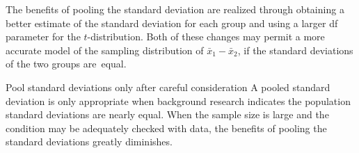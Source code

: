 {The benefits of pooling the standard deviation are realized through obtaining a better estimate of the standard deviation for each group and using a larger df parameter for the $t$-distribution. Both of these changes may permit a more accurate model of the sampling distribution of $\bar{x}_1 - \bar{x}_2$, if the standard deviations of the two groups are~equal.

\begin{caution}
{Pool standard deviations only after careful consideration}
{A pooled standard deviation is only appropriate when background research indicates the population standard deviations are nearly equal. When the sample size is large and the condition may be adequately checked with data, the benefits of pooling the standard deviations greatly diminishes.}
\end{caution}
}

